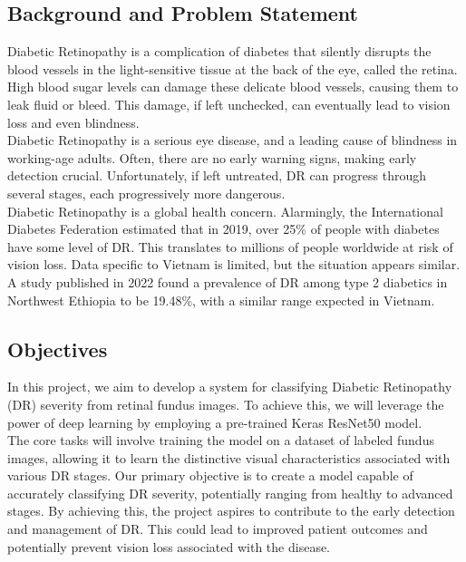 \documentclass[conference]{IEEEtran}
\begin{document}
\subsection{Background and Problem Statement}

Diabetic Retinopathy is a complication of diabetes that silently disrupts the blood vessels in the light-sensitive tissue at the back of the eye, called the retina. High blood sugar levels can damage these delicate blood vessels, causing them to leak fluid or bleed. This damage, if left unchecked, can eventually lead to vision loss and even blindness. \\

Diabetic Retinopathy is a serious eye disease, and a leading cause of blindness in working-age adults.  Often, there are no early warning signs, making early detection crucial.  Unfortunately, if left untreated, DR can progress through several stages, each progressively more dangerous. \\

Diabetic Retinopathy is a global health concern.  Alarmingly, the International Diabetes Federation estimated that in 2019, over 25\% of people with diabetes have some level of DR. This translates to millions of people worldwide at risk of vision loss. Data specific to Vietnam is limited, but the situation appears similar. A study published in 2022 found a prevalence of DR among type 2 diabetics in Northwest Ethiopia to be 19.48\%, with a similar range expected in Vietnam. \\

\subsection{Objectives}

In this project, we aim to develop a system for classifying Diabetic Retinopathy (DR) severity from retinal fundus images. To achieve this, we will leverage the power of deep learning by employing a pre-trained Keras ResNet50 model.\\

The core tasks will involve training the model on a dataset of labeled fundus images, allowing it to learn the distinctive visual characteristics associated with various DR stages. Our primary objective is to create a model capable of accurately classifying DR severity, potentially ranging from healthy to advanced stages. By achieving this, the project aspires to contribute to the early detection and management of DR. This could lead to improved patient outcomes and potentially prevent vision loss associated with the disease. \\
\end{document}
